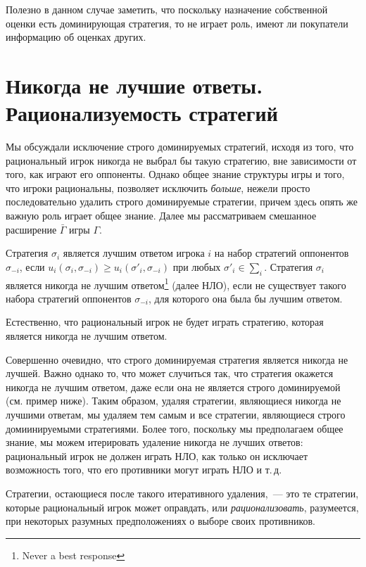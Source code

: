 \documentclass[12pt]{article}
\begin{document}
Полезно в данном случае заметить, что поскольку назначение
собственной оценки есть доминирующая стратегия, то не играет роль,
имеют ли покупатели информацию об оценках других.


\section{Никогда не лучшие ответы. Рационализуемость стратегий}

Мы обсуждали исключение строго доминируемых стратегий, исходя из
того, что рациональный игрок никогда не выбрал бы такую стратегию,
вне зависимости от того, как играют его оппоненты. Однако общее
знание структуры игры и того, что игроки рациональны, позволяет
исключить {\it больше}, нежели просто последовательно удалить строго
доминируемые стратегии, причем здесь опять же важную роль играет
общее знание.  Далее мы рассматриваем смешанное расширение
$\bar\Gamma$ игры $\Gamma$.

\begin{definition}
Стратегия $\sigma_i$ является лучшим ответом игрока $i$ на набор
стратегий оппонентов $\sigma_{-i}$, если
$u_i(\sigma_i,\sigma_{-i})\ge u_i(\sigma'_i,\sigma_{-i})$ при любых
$\sigma'_i\in\sum_i$. Стратегия $\sigma_i$ является никогда не
лучшим ответом\footnote{ Never a best response} (далее НЛО), если не
существует такого набора стратегий оппонентов  $\sigma_{-i}$, для
которого она была бы лучшим ответом.
\end{definition}

Естественно, что рациональный игрок не будет играть стратегию,
которая является никогда не лучшим ответом.

Совершенно очевидно, что строго доминируемая стратегия является
никогда не лучшей. Важно однако то, что может случиться так, что
стратегия окажется никогда не лучшим ответом, даже если она не
является строго доминируемой (см. пример ниже). Таким образом,
удаляя стратегии, являющиеся никогда не лучшими ответам, мы удаляем
тем самым и все стратегии, являющиеся строго домиинируемыми
стратегиями. Более того, поскольку мы предполагаем общее знание, мы
можем итерировать удаление никогда не лучших ответов: рациональный
игрок не должен играть НЛО, как только он исключает возможность
того, что его противники могут играть НЛО и т.\,д.

Стратегии, остающиеся после такого итеративного удаления,~--- это те
стратегии, которые рациональный игрок может оправдать, или {\it
рационализовать}, разумеется, при некоторых разумных предположениях
о выборе своих противников.
\end{document}
